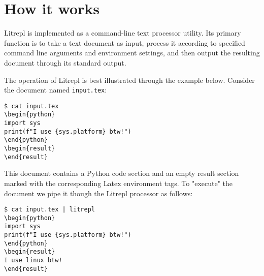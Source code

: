 \documentclass[a4paper,12pt,twocolumn]{article}
\begin{document}
\section{How it works}

Litrepl is implemented as a command-line text processor utility. Its primary
function is to take a text document as input, process it according to specified
command line arguments and environment settings, and then output the resulting
document through its standard output.

The operation of Litrepl is best illustrated through the example below. Consider
the document named \verb|input.tex|:

\begin{comment}
\begin{sh}
echo '\begin{verbatim}'
echo '$ cat input.tex'
cat input.tex
echo '\end{verbatim}'
\end{sh}
\end{comment}
\begin{verbatim}
$ cat input.tex
\begin{python}
import sys
print(f"I use {sys.platform} btw!")
\end{python}
\begin{result}
\end{result}
\end{verbatim}

This document contains a Python code section and an empty result section marked
with the corresponding Latex environment tags. To "execute" the document we
pipe it though the Litrepl processor as follows:

\begin{comment}
\begin{sh}
echo '\begin{verbatim}'
echo '$ cat input.tex | litrepl'
echo "sys.platform='linux'" | litrepl repl python >/dev/null
cat input.tex | litrepl
echo '\end{verbatim}'
\end{sh}
\end{comment}
\begin{verbatim}
$ cat input.tex | litrepl
\begin{python}
import sys
print(f"I use {sys.platform} btw!")
\end{python}
\begin{result}
I use linux btw!
\end{result}
\end{verbatim}
\end{document}
